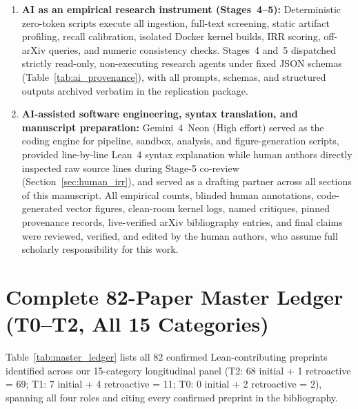 \documentclass[11pt,letterpaper]{article}
\begin{document}
\begin{enumerate}
  \item \textbf{AI as an empirical research instrument (Stages~4--5):} Deterministic zero-token scripts execute all ingestion, full-text screening, static artifact profiling, recall calibration, isolated Docker kernel builds, IRR scoring, off-arXiv queries, and numeric consistency checks. Stages~4 and~5 dispatched strictly read-only, non-executing research agents under fixed JSON schemas (Table~\ref{tab:ai_provenance}), with all prompts, schemas, and structured outputs archived verbatim in the replication package.
  \item \textbf{AI-assisted software engineering, syntax translation, and manuscript preparation:} Gemini~4~Neon (High effort) served as the coding engine for pipeline, sandbox, analysis, and figure-generation scripts, provided line-by-line Lean~4 syntax explanation while human authors directly inspected raw source lines during Stage-5 co-review (Section~\ref{sec:human_irr}), and served as a drafting partner across all sections of this manuscript. All empirical counts, blinded human annotations, code-generated vector figures, clean-room kernel logs, named critiques, pinned provenance records, live-verified arXiv bibliography entries, and final claims were reviewed, verified, and edited by the human authors, who assume full scholarly responsibility for this work.
\end{enumerate}

\appendix
\section{Complete 82-Paper Master Ledger (T0--T2, All 15 Categories)}
\label{app:master_ledger}

Table~\ref{tab:master_ledger} lists all 82 confirmed Lean-contributing preprints identified across our 15-category longitudinal panel (T2: 68 initial + 1 retroactive = 69; T1: 7 initial + 4 retroactive = 11; T0: 0 initial + 2 retroactive = 2), spanning all four roles and citing every confirmed preprint in the bibliography.
\end{document}
